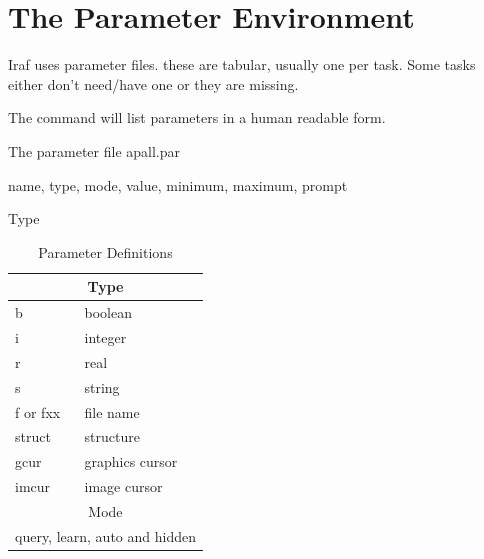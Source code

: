 \renewcommand{\footerfilename}{Parms.tex}

\section{The Parameter Environment}

Iraf uses parameter files. these are tabular, usually one per task.
Some tasks either don't need/have one or they are missing.

The command   will list parameters in a 
human readable form. 

The parameter file apall.par

name, type, mode, value, minimum, maximum, prompt

Type

\begin{table}[h!]
\centering
\begin{tabular}{| l | l |}
\hline
\multicolumn{2}{c}{Type} \
Type  & Meaning   \\
\hline
b        & boolean     \\ 
i        & integer     \\ 
r        & real     \\ 
s        & string     \\ 
f or fxx & file name     \\ 
struct   & structure     \\ 
gcur     & graphics cursor     \\ 
imcur    & image cursor     \\ 
\multicolumn{2}{c}{Mode} \\
\multicolumn{2}{c}{query, learn, auto and hidden} \\
\hline
\end{tabular}
\caption[TOC]{ Parameter Definitions}
\label{table:ParameterDefinitions}
\end{table}


